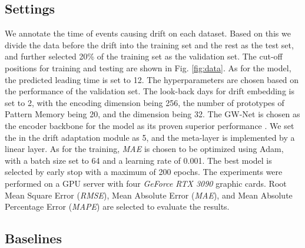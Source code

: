 \documentclass[sigconf]{acmart}
\begin{document}
\subsection{Settings}
We annotate the time of events causing drift on each dataset. Based on this we divide the data before the drift into the training set and the rest as the test set, and further selected 20\% of the training set as the validation set. The cut-off positions for training and testing are shown in Fig. \ref{fig:data}. As for the model, the predicted leading time  is set to 12. The hyperparameters are chosen based on the performance of the validation set. The look-back days  for drift embedding is set to 2, with the encoding dimension  being 256, the number of prototypes  of Pattern Memory being 20, and the dimension  being 32. The GW-Net \cite{wu2019graph} is chosen as the encoder backbone for the model as its proven superior performance \cite{jiang2021dl}. We set the  in the drift adaptation module as 5, and the meta-layer is implemented by a linear layer. As for the training, \textit{MAE} is chosen to be optimized using Adam, with a batch size set to 64 and a learning rate of 0.001. The best model is selected by early stop with a maximum of 200 epochs. The experiments were performed on a GPU server with four \textit{GeForce RTX 3090} graphic cards. Root Mean Square Error (\textit{RMSE}), Mean Absolute Error (\textit{MAE}), and Mean Absolute Percentage Error (\textit{MAPE}) are selected to evaluate the results.

\subsection{Baselines}
\end{document}
